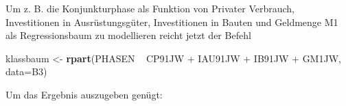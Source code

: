 \documentclass[12pt,]{book}
\makeatletter
\newenvironment{Shaded}{\begin{snugshade}}{\end{snugshade}}
\newcommand{\KeywordTok}[1]{\textcolor[rgb]{0.13,0.29,0.53}{\textbf{{#1}}}}
\newcommand{\DataTypeTok}[1]{\textcolor[rgb]{0.13,0.29,0.53}{{#1}}}
\newcommand{\StringTok}[1]{\textcolor[rgb]{0.31,0.60,0.02}{{#1}}}
\newcommand{\NormalTok}[1]{{#1}}
\newenvironment{kframe}{%
\medskip{}
\setlength{\fboxsep}{.8em}
 \def\at@end@of@kframe{}%
 \ifinner\ifhmode%
  \def\at@end@of@kframe{\end{minipage}}%
  \begin{minipage}{\columnwidth}%
 \fi\fi%
 \def\FrameCommand##1{\hskip\@totalleftmargin \hskip-\fboxsep
 \colorbox{shadecolor}{##1}\hskip-\fboxsep
     \hskip-\linewidth \hskip-\@totalleftmargin \hskip\columnwidth}%
 \MakeFramed {\advance\hsize-\width
   \@totalleftmargin\z@ \linewidth\hsize
   \@setminipage}}%
 {\par\unskip\endMakeFramed%
 \at@end@of@kframe}
\renewenvironment{Shaded}{\begin{kframe}}{\end{kframe}}
\makeatother
\begin{document}
\begin{Shaded}
\end{Shaded}

Um z. B. die Konjunkturphase als Funktion von Privater Verbrauch,
Investitionen in Ausrüstungsgüter, Investitionen in Bauten und Geldmenge
M1 als Regressionsbaum zu modellieren reicht jetzt der Befehl

\begin{Shaded}
\begin{Highlighting}[]
\NormalTok{klassbaum <-}\StringTok{ }\KeywordTok{rpart}\NormalTok{(PHASEN ~}\StringTok{ }\NormalTok{CP91JW +}\StringTok{ }\NormalTok{IAU91JW +}\StringTok{ }\NormalTok{IB91JW +}\StringTok{ }\NormalTok{GM1JW, }\DataTypeTok{data=}\NormalTok{B3)}
\end{Highlighting}
\end{Shaded}

Um das Ergebnis auszugeben genügt:
\end{document}
